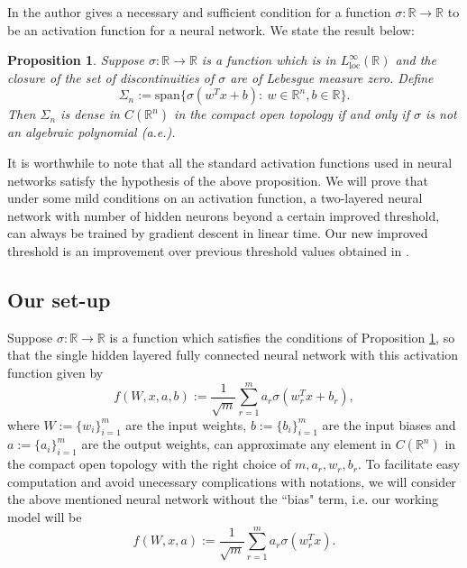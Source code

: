 \documentclass[a4paper,11pt]{amsart}
\theoremstyle{definition}
\theoremstyle{plain}
\newtheorem{ppsn}[dfn]{Proposition}
\theoremstyle{remark}
\newcommand{\IR}{\mathbb{R}}
\begin{document}
In \cite[Theorem 1]{proofNeural} the author gives a necessary and sufficient condition for a function $\sigma:\IR\longrightarrow\IR$ to be an activation function for a neural network. We state the result below:
\begin{ppsn}\label{Proposition: From the neural proof paper}{\cite[Theorem 1]{proofNeural}}
Suppose $\sigma:\IR\longrightarrow\IR$ is a function which is in $L^\infty_{\text{loc}}(\IR)$ and the closure of the set of discontinuities of $\sigma$ are of Lebesgue measure zero. Define 
\[
\Sigma_n:=\text{span}\{\sigma(w^Tx+b):~w\in\IR^n,b\in\IR\}.  
\]
Then $\Sigma_n$ is dense in $C(\IR^n)$ in the compact open topology if and only if $\sigma$ is not an algebraic polynomial (a.e.).
\end{ppsn}

It is worthwhile to note that all the standard activation functions used in neural networks satisfy the hypothesis of the above proposition. We will prove that under some mild conditions on an activation function, a two-layered neural network with number of hidden neurons beyond a certain improved threshold, can always be trained by gradient descent in linear time. Our new improved threshold is an improvement over previous threshold values obtained in \cite{gdescentOverPara1, gdescentOverPara2}.

\subsection{Our set-up}\label{Subsection: our setup}
Suppose $\sigma:\IR\longrightarrow\IR$ is a function which satisfies the conditions of Proposition \ref{Proposition: From the neural proof paper}, so that the single hidden layered fully connected neural network with this activation function given by 
\begin{equation}\label{Equation: Neural network}
f(W,x,a,b):=\frac{1}{\sqrt{m}}\sum_{r=1}^ma_r\sigma(w_r^Tx+b_r), 
\end{equation}
where $W:=\{w_i\}_{i=1}^m$ are the input weights, $b:=\{b_i\}_{i=1}^m$ are the input biases and $a:=\{a_i\}_{i=1}^m$ are the output weights, can approximate any element in $C(\IR^n)$ in the compact open topology with the right choice of $m, a_r,w_r,b_r$. To facilitate easy computation and avoid unecessary complications with notations, we will consider the above mentioned neural network without the ``bias" term, i.e. our working model will be 
\[
f(W,x,a):=\frac{1}{\sqrt{m}}\sum_{r=1}^ma_r\sigma(w_r^Tx). 
\]
\end{document}
